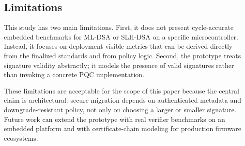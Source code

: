 \subsection{Limitations}

This study has two main limitations. First, it does not present cycle-accurate embedded benchmarks for ML-DSA or SLH-DSA on a specific microcontroller. Instead, it focuses on deployment-visible metrics that can be derived directly from the finalized standards and from policy logic. Second, the prototype treats signature validity abstractly; it models the presence of valid signatures rather than invoking a concrete PQC implementation.

These limitations are acceptable for the scope of this paper because the central claim is architectural: secure migration depends on authenticated metadata and downgrade-resistant policy, not only on choosing a larger or smaller signature. Future work can extend the prototype with real verifier benchmarks on an embedded platform and with certificate-chain modeling for production firmware ecosystems.
